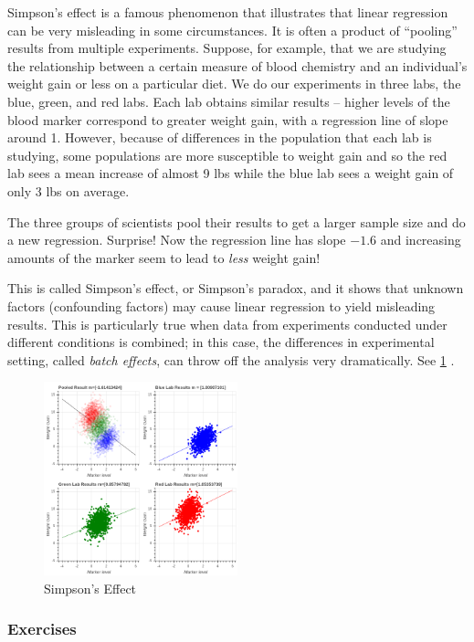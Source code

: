 \documentclass[]{article}
\begin{document}
Simpson's effect is a famous phenomenon that illustrates that linear
regression can be very misleading in some circumstances. It is often a
product of ``pooling'' results from multiple experiments. Suppose, for
example, that we are studying the relationship between a certain measure
of blood chemistry and an individual's weight gain or less on a
particular diet. We do our experiments in three labs, the blue, green,
and red labs. Each lab obtains similar results -- higher levels of the
blood marker correspond to greater weight gain, with a regression line
of slope around 1. However, because of differences in the population
that each lab is studying, some populations are more susceptible to
weight gain and so the red lab sees a mean increase of almost 9 lbs
while the blue lab sees a weight gain of only 3 lbs on average.

The three groups of scientists pool their results to get a larger sample
size and do a new regression. Surprise! Now the regression line has
slope \(-1.6\) and increasing amounts of the marker seem to lead to
\emph{less} weight gain!

This is called Simpson's effect, or Simpson's paradox, and it shows that
unknown factors (confounding factors) may cause linear regression to
yield misleading results. This is particularly true when data from
experiments conducted under different conditions is combined; in this
case, the differences in experimental setting, called \emph{batch
effects}, can throw off the analysis very dramatically. See
\cref{fig:simpsons} .

\begin{figure}
\hypertarget{fig:simpsons}{%
\centering
\includegraphics[width=0.5\textwidth,height=\textheight]{../img/SimpsonsEffect.png}
\caption{Simpson's Effect}\label{fig:simpsons}
}
\end{figure}

\hypertarget{exercises-1}{%
\subsubsection{Exercises}\label{exercises-1}}
\end{document}
